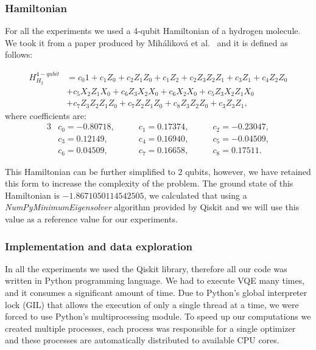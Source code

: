 \subsubsection{Hamiltonian}
For all the experiments we used a 4-qubit Hamiltonian of a hydrogen molecule. We took it from a paper produced by Miháliková et al.~\cite{mihalikova} and it is defined as follows:

\begin{align*}H_{H_2}^{4-qubit} &= c_{0}1 + c_{1}Z_{0} + c_{2}Z_{1}Z_{0} + c_{1}Z_{2} + c_{2}Z_{3}Z_{2}Z_{1} + c_{3}Z_{1} + c_{4}Z_{2}Z_{0}\\
                                &+ c_{5}X_{2}Z_{1}X_{0} + c_{6}Z_{3}X_{2}X_{0} + c_{6}X_{2}X_{0} + c_{5}Z_{3}X_{2}Z_{1}X_{0}\\
                                &+c_{7}Z_{3}Z_{2}Z_{1}Z_{0} + c_{7}Z_{2}Z_{1}Z_{0} + c_{8}Z_{3}Z_{2}Z_{0} + c_{3}Z_{3}Z_{1},
\end{align*}
where coefficients are:
\begin{alignat*}{3}
    &c_0 = -0.80718,\qquad &c_1 = 0.17374,\qquad &c_2 =-0.23047, \\
    &c_3 = 0.12149,\qquad  &c_4 = 0.16940,\qquad &c_5 = -0.04509, \\
    &c_6 = 0.04509,\qquad  &c_7 = 0.16658,\qquad &c_8 = 0.17511.
\end{alignat*}

This Hamiltonian can be further simplified to 2 qubits, however, we have retained this form to increase the complexity of the problem. The ground state of this Hamiltonian is $-1.8671050114542505$, we calculated that using a \textit{NumPyMinimumEigensolver} algorithm provided by Qiskit and we will use this value as a reference value for our experiments.

\subsubsection{Implementation and data exploration}
In all the experiments we used the Qiskit library, therefore all our code was written in Python programming language. We had to execute VQE many times, and it consumes a significant amount of time. Due to Python's global interpreter lock (GIL) that allows the execution of only a single thread at a time, we were forced to use Python's multiprocessing module. To speed up our computations we created multiple processes, each process was responsible for a single optimizer and these processes are automatically distributed to available CPU cores.

